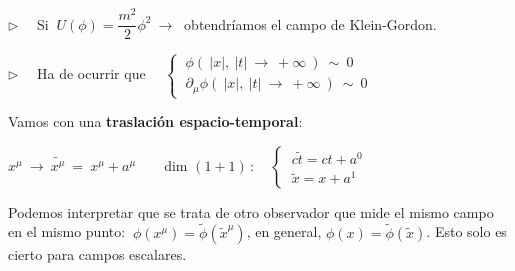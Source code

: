\hspace{1cm} $\triangleright \quad$ Si $\ U(\phi)=\dfrac{m^2}2\phi^2 \ \to \ $ obtendríamos el campo de Klein-Gordon.

\hspace{1cm} $\triangleright \quad$ Ha de ocurrir que $\quad\begin{cases} \ \phi(\ |x|,\ |t| \ \to \ +\infty \  ) \ \sim \ 0 \\ \ \partial_\mu \phi(\ |x|,\ |t| \ \to \ +\infty \  ) \ \sim \ 0  \end{cases}$


\vspace{5mm}Vamos con una \textbf{traslación espacio-temporal}:

$x^\mu \ \to \ \widetilde{x^\mu} \ = \ x^\mu + a^\mu  \qquad \text{dim }(1+1)\, : \quad \begin{cases}\ c\tilde t = ct+a^0 \\ \ \tilde x=x+a^1 \end{cases}$

Podemos interpretar que se trata de otro observador que mide el mismo campo en el mismo punto: $\ \phi(x^\mu)= \tilde \phi(\tilde  x^\mu)$, en general, $\phi(x)=\tilde \phi(\tilde x)$. Esto solo es cierto para campos escalares.

